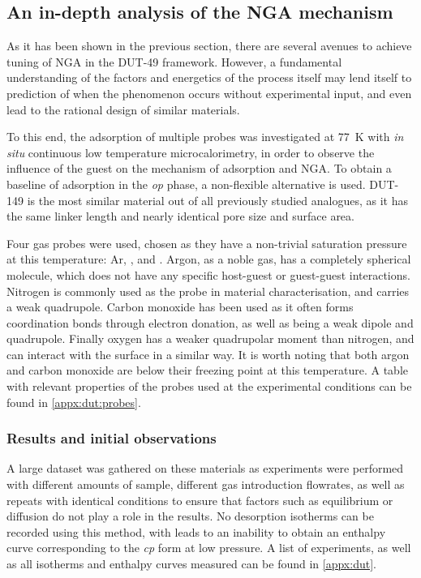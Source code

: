 
\subsection{An in-depth analysis of the NGA mechanism}%
\label{dut:indepth}

As it has been shown in the previous section, there are 
several avenues to achieve tuning of NGA in the DUT-49 framework.
However, a fundamental understanding of the factors and 
energetics of the process itself may
lend itself to prediction of when the phenomenon occurs without 
experimental input, and even lead to the rational design of 
similar materials.

To this end, the adsorption of multiple probes was investigated 
at \SI{77}{\kelvin} with \textit{in situ} continuous low 
temperature microcalorimetry,
in order to observe the influence of the guest on the mechanism of
adsorption and NGA. To obtain a baseline of adsorption in 
the \textit{op} phase, a non-flexible alternative is used. 
DUT-149 is the most similar material out of all previously studied
analogues, as it has the same linker length and nearly identical pore
size and surface area.

Four gas probes were used, chosen as they 
have a non-trivial saturation pressure at this temperature: Ar,
,  and . Argon, as a 
noble gas, has a completely spherical molecule, which does not 
have any specific host-guest or guest-guest interactions. Nitrogen
is commonly used as the probe in material characterisation, 
and carries a weak quadrupole. Carbon monoxide has been used 
as it often forms coordination bonds through electron donation,
as well as being a weak dipole and quadrupole.
Finally oxygen has a weaker quadrupolar moment than 
nitrogen, and can interact with the surface in a similar way.
It is worth noting that both argon and carbon monoxide are below 
their freezing point at this temperature. A table with 
relevant properties of the probes used at the experimental
conditions can be found in \autoref{appx:dut:probes}.

\subsubsection{Results and initial observations}

A large dataset was gathered
on these materials as experiments were performed with different 
amounts of sample, different gas introduction flowrates, as well as repeats
with identical conditions to ensure that factors such as 
equilibrium or diffusion do not play a role in the results. 
No desorption isotherms can be recorded using this method, with
leads to an inability to obtain an enthalpy curve corresponding 
to the \textit{cp} form at low pressure. A list 
of experiments, as well as all isotherms and enthalpy curves measured can
be found in \autoref{appx:dut}.

